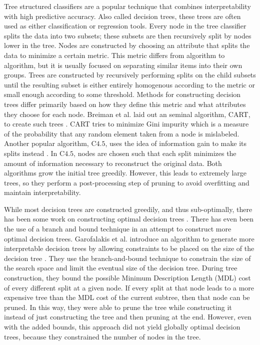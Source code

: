 Tree structured classifiers are a popular technique that combines interpretability with high predictive accuracy.
Also called decision trees, these trees are often used as either classification or regression tools.
Every node in the tree classifier splits the data into two subsets; these subsets are then recursively split by nodes lower in the tree.
Nodes are constructed by choosing an attribute that splits the data to minimize a certain metric.
This metric differs from algorithm to algorithm, but it is usually focused on separating similar items into their own groups.%
Trees are constructed by recursively performing splits on the child subsets until the resulting subset is either entirely homogenous according to the metric or small enough according to some threshold.
Methods for constructing decision trees differ primarily based on how they define this metric and what attributes they choose for each node.
Breiman et al. laid out an seminal algorithm, CART, to create such trees \cite{BreimanFrOlSt84}.
CART tries to minimize Gini impurity which is a measure of the probability that any random element taken from a node is mislabeled.
Another popular algorithm, C$4.5$, uses the idea of information gain to make its splits instead \cite{Quinlan93}.
In C$4.5$, nodes are chosen such that each split minimizes the amount of information necessary to reconstruct the original data.
Both algorithms grow the initial tree greedily.
However, this leads to extremely large trees, so they perform a post-processing step of pruning to avoid overfitting and maintain interpretability.

While most decision trees are constructed greedily, and thus sub-optimally, there has been some work on constructing optimal decision trees \cite{Moret82}.
There has even been the use of a branch and bound technique in an attempt to construct more optimal decision trees.
Garofalakis et al. introduce an algorithm to generate more interpretable decision trees by allowing constraints to be placed on the size of the decision tree \cite{GarofalakisHyRaSh00}.
They use the branch-and-bound technique to constrain the size of the search space and limit the eventual size of the decision tree.
During tree construction, they bound the possible Minimum Description Length (MDL) cost of every different split at a given node.
If every split at that node leads to a more expensive tree than the MDL cost of the current subtree, then that node can be pruned.
In this way, they were able to prune the tree while constructing it instead of just constructing the tree and then pruning at the end.
However, even with the added bounds, this approach did not yield globally optimal decision trees, because they constrained the number of nodes in the tree.

